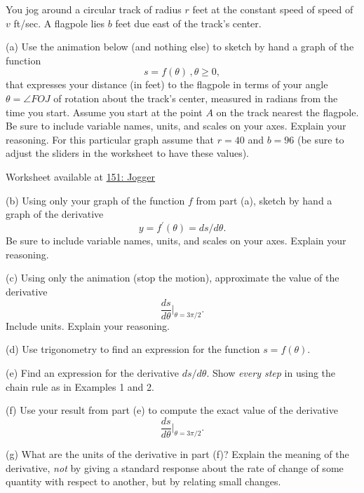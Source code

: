 \documentclass{ximera}
\begin{document}
\begin{exercise}  \label{Ex:dsfthnmmm}
You jog around a circular track of radius $r$ feet at the constant speed of speed of $v$ ft/sec. A flagpole lies $b$ feet due east of the track's center.

(a) Use the animation below (and nothing else) to sketch by hand a graph of the function 
\[
   s = f(\theta) \, , \theta \geq 0,
\]
that expresses your distance (in feet) to the flagpole in terms of your angle $\theta = \angle FOJ$ of rotation about the track's center, measured in radians from the time you start. Assume you start at the point $A$ on the track nearest the flagpole. Be sure to include variable names, units, and scales on your axes. Explain your reasoning. For this particular graph assume that $r=40$ and $b=96$ (be sure to adjust the sliders in the worksheet to have these values).

\begin{onlineOnly}
    \begin{center}
\end{center}
\end{onlineOnly}

Worksheet available at \href{https://www.desmos.com/calculator/4pndurvhdd}{151: Jogger}

(b) Using only your graph of the function $f$ from part (a), sketch by hand a graph of the derivative
\[
    y = f^\prime(\theta) = ds/d\theta .
\]
Be sure to include variable names, units, and scales on your axes. Explain your reasoning.

(c) Using only the animation (stop the motion), approximate the value of the derivative
\[
     \frac{ds}{d\theta} \Big|_{\theta = 3\pi/2} .
\]
Include units. Explain your reasoning.

(d) Use trigonometry to find an expression for the function $s=f(\theta)$.

(e) Find an expression for the derivative $ds/d\theta$. Show \emph{every step} in using the chain rule as in Examples 1 and 2. %

(f) Use your result from part (e) to compute the exact value of the derivative
\[
     \frac{ds}{d\theta} \Big|_{\theta = 3\pi/2}  .
\]

(g) What are the units of the derivative in part (f)? Explain the meaning of the derivative, \emph{not} by giving a standard response about the rate of change of some quantity with respect to another, but by relating small changes.


\end{exercise}
\end{document}
